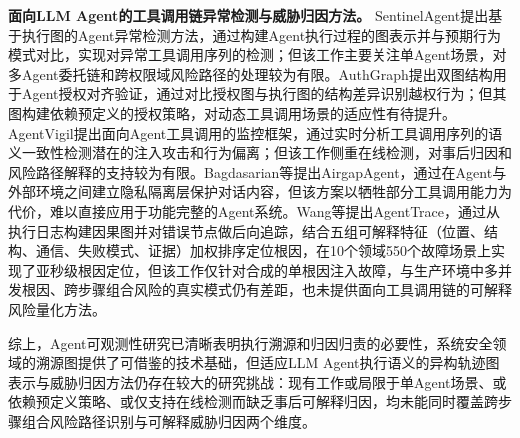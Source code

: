 \textbf{面向LLM Agent的工具调用链异常检测与威胁归因方法。}
SentinelAgent\cite{he2025sentinelagent}提出基于执行图的Agent异常检测方法，通过构建Agent执行过程的图表示并与预期行为模式对比，实现对异常工具调用序列的检测；但该工作主要关注单Agent场景，对多Agent委托链和跨权限域风险路径的处理较为有限。AuthGraph\cite{wang2026authgraph}提出双图结构用于Agent授权对齐验证，通过对比授权图与执行图的结构差异识别越权行为；但其图构建依赖预定义的授权策略，对动态工具调用场景的适应性有待提升。AgentVigil\cite{wang2025agentvigil}提出面向Agent工具调用的监控框架，通过实时分析工具调用序列的语义一致性检测潜在的注入攻击和行为偏离；但该工作侧重在线检测，对事后归因和风险路径解释的支持较为有限。Bagdasarian等\cite{bagdasarian2024airgapagent}提出AirgapAgent，通过在Agent与外部环境之间建立隐私隔离层保护对话内容，但该方案以牺牲部分工具调用能力为代价，难以直接应用于功能完整的Agent系统。Wang等\cite{wang2026agenttrace}提出AgentTrace，通过从执行日志构建因果图并对错误节点做后向追踪，结合五组可解释特征（位置、结构、通信、失败模式、证据）加权排序定位根因，在10个领域550个故障场景上实现了亚秒级根因定位，但该工作仅针对合成的单根因注入故障，与生产环境中多并发根因、跨步骤组合风险的真实模式仍有差距，也未提供面向工具调用链的可解释风险量化方法。

综上，Agent可观测性研究已清晰表明执行溯源和归因归责的必要性，系统安全领域的溯源图提供了可借鉴的技术基础，但适应LLM Agent执行语义的异构轨迹图表示与威胁归因方法仍存在较大的研究挑战：现有工作或局限于单Agent场景、或依赖预定义策略、或仅支持在线检测而缺乏事后可解释归因，均未能同时覆盖跨步骤组合风险路径识别与可解释威胁归因两个维度。
